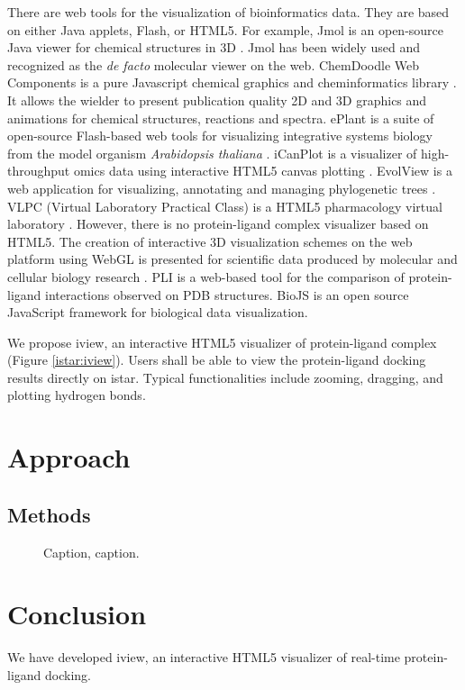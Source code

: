 \documentclass{bioinfo}
\begin{document}
There are web tools for the visualization of bioinformatics data. They are based on either Java applets, Flash, or HTML5. For example, Jmol is an open-source Java viewer for chemical structures in 3D \citep{1263}. Jmol has been widely used and recognized as the \textit{de facto} molecular viewer on the web. ChemDoodle Web Components is a pure Javascript chemical graphics and cheminformatics library \citep{1264}. It allows the wielder to present publication quality 2D and 3D graphics and animations for chemical structures, reactions and spectra.  ePlant is a suite of open-source Flash-based web tools for visualizing integrative systems biology from the model organism \textit{Arabidopsis thaliana} \citep{1242}. iCanPlot is a visualizer of high-throughput omics data using interactive HTML5 canvas plotting \citep{1028}. EvolView is a web application for visualizing, annotating and managing phylogenetic trees \citep{1241}. VLPC (Virtual Laboratory Practical Class) is a HTML5 pharmacology virtual laboratory \citep{1249}. However, there is no protein-ligand complex visualizer based on HTML5. The creation of interactive 3D visualization schemes on the web platform using WebGL is presented for scientific data produced by molecular and cellular biology research \citep{1262}. PLI \citep{1288} is a web-based tool for the comparison of protein-ligand interactions observed on PDB structures. BioJS \citep{1308} is an open source JavaScript framework for biological data visualization.

We propose iview, an interactive HTML5 visualizer of protein-ligand complex (Figure \ref{istar:iview}). Users shall be able to view the protein-ligand docking results directly on istar. Typical functionalities include zooming, dragging, and plotting hydrogen bonds.

\section{Approach}


\begin{methods}
\section{Methods}


\end{methods}

\begin{figure}[!tpb]%
\caption{Caption, caption.}\label{fig:01}
\end{figure}

\section{Conclusion}

We have developed iview, an interactive HTML5 visualizer of real-time protein-ligand docking.


%
%
%
%
%
%


\end{document}
